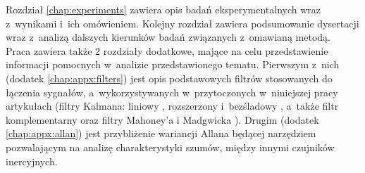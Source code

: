 Rozdział \ref{chap:experiments} zawiera opis badań eksperymentalnych wraz z~wynikami i~ich omówieniem. Kolejny rozdział zawiera podsumowanie dysertacji wraz z~analizą dalszych kierunków badań związanych z~omawianą metodą.\\

Praca zawiera także 2 rozdziały dodatkowe, mające na celu przedstawienie informacji pomocnych w~analizie przedstawionego tematu. Pierwszym z~nich (dodatek \ref{chap:appx:filters}) jest opis podstawowych filtrów stosowanych do łączenia sygnałów, a~wykorzystywanych w~przytoczonych w~niniejszej pracy artykułach (filtry Kalmana: liniowy \cite{Kalman1960}, rozszerzony \cite{smith1962application} i~bezśladowy \cite{Julier1995}, a~także filtr komplementarny \cite{Euston2008} oraz filtry Mahoney'a \cite{Baldwin2007} i Madgwicka \cite{Madgwick2010}). Drugim (dodatek \ref{chap:appx:allan}) jest przybliżenie wariancji Allana \cite{Allan1966}  będącej narzędziem pozwalającym na analizę charakterystyki szumów, między innymi czujników inercyjnych.
